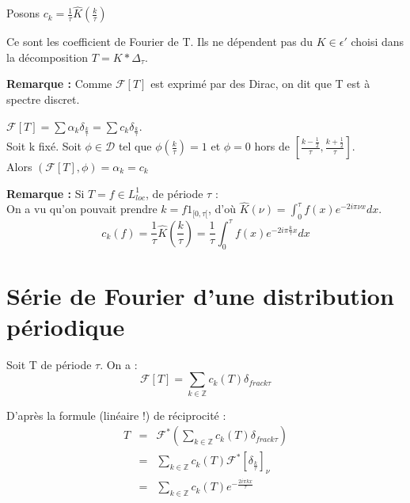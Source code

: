 \documentclass{article}
\begin{document}
Posons $c_k=\frac{1}{\tau} \hat{K}\left( \frac{k}{\tau} \right)$ 


Ce sont les coefficient de Fourier de T. Ils ne dépendent pas du $K\in\epsilon'$ choisi dans la décomposition $T=K*\Delta_{\tau}$.

\bigskip
\textbf{Remarque : } Comme $\mathcal{F}[T]$ est exprimé par des Dirac, on dit que T est à spectre discret.

\begin{dem}
	$\mathcal{F}[T]=\sum \alpha_k \delta_{\frac{k}{\tau}} = \sum c_k \delta_{\frac{k}{\tau}}$.\\
	Soit k fixé. Soit $\phi \in \mathcal{D}$ tel que $\phi\left( \frac{k}{\tau} \right)=1$ et $\phi=0$ hors de $\left[\frac{k-\frac{1}{2}}{\tau},\frac{k+\frac{1}{2}}{\tau}\right]$.\\
	Alors $(\mathcal{F}[T],\phi)=\alpha_k = c_k$
\end{dem}

\textbf{Remarque : } Si $T=f \in L^1_{loc}$, de période $\tau$ : \\
On a vu qu'on pouvait prendre $k=f1_{[0,\tau[}$, d'où $\hat{K}(\nu)=\int_0^{\tau} f(x)e^{-2i\pi\nu x} dx$.
		\[ c_k(f)=\frac{1}{\tau} \hat{K}\left( \frac{k}{\tau} \right) = \frac{1}{\tau} \int_0^{\tau} f(x)e^{-2i\pi \frac{k}{\tau}x}  dx\]

\section{Série de Fourier d'une distribution périodique}
Soit T de période $\tau$. On a : 
\[\mathcal{F}[T] = \sum_{k\in\mathbb{Z}} c_k(T) \delta_{frac{k}{\tau}} \]

D'après la formule (linéaire !) de réciprocité : 
\begin{eqnarray*}
T&=& \mathcal{F}^* \left( \sum_{k\in\mathbb{Z}} c_k(T) \delta_{frac{k}{\tau}} \right) \\
	&=& \sum_{k\in\mathbb{Z}} c_k(T) \mathcal{F}^* \left[\delta_{\frac{k}{\tau}}\right]_{\nu} \\
	&=& \sum_{k\in\mathbb{Z}} c_k(T) e^{-\frac{2i\pi kx}{\tau}} 
\end{eqnarray*}

\end{document}
